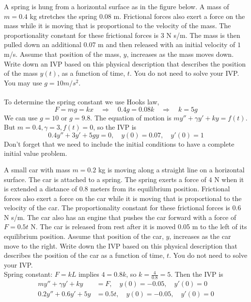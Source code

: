 \ifnum {}
\question[2] A spring is hung from a horizontal surface as in the figure below. A mass of $m=0.4$ kg stretches the spring 0.08 m. Frictional forces also exert a force on the mass while it is moving that is proportional to the velocity of the mass. The proportionality constant for these frictional forces is 3 N s/m. The mass is then pulled down an additional 0.07 m and then released with an initial velocity of $1$ m/s. Assume that position of the mass, $y$, increases as the mass moves down. Write down an IVP based on this physical description that describes the position of the mass $y(t)$, as a function of time, $t$. You do not need to solve your IVP. You may use $g=10 m/s^2$.  \\[4pt]


\ifnum {} {\color{DarkBlue} \\[12pt] 
To determine the spring constant we use Hooks law, 
$$F = mg  = kx \quad \Rightarrow \quad 0.4g = 0.08k \quad \Rightarrow \quad k = 5g$$
We can use $g=10$ or $g=9.8$. The equation of motion is $my''+\gamma y' + ky = f(t)$.
But $m=0.4, \gamma = 3, f(t) = 0$, so the IVP is
$$0.4y'' + 3 y' + 5gy = 0, \quad y(0) = 0.07, \quad y'(0) = 1$$
Don't forget that we need to include the initial conditions to have a complete initial value problem.
} 
\else 
\vfill
\fi
\fi 



\ifnum {}
\question[2] A small car with mass $m = 0.2$ kg is moving along a straight line on a horizontal surface. The car is attached to a spring. The spring exerts a force of $4$ N when it is extended a distance of $0.8$ meters from its equilibrium position. Frictional forces also exert a force on the car while it is moving that is proportional to the velocity of the car. The proportionality constant for these frictional forces is $0.6$ N s/m. The car also has an engine that pushes the car forward with a force of $F = 0.5t$ N. The car is released from rest after it is moved 0.05 m to the left of its equilibrium position. Assume that position of the car, $y$, increases as the car move to the right. Write down the IVP based on this physical description that describes the position of the car as a function of time, $t$. You do not need to solve your IVP. \\
% 

\ifnum {} {\color{DarkBlue} 
Spring constant: $F = kL$ implies $4 = 0.8k$, so $k = \frac{4}{0.8} = 5$. Then the IVP is
\begin{align}
    my'' + \gamma y' + ky &= F, \quad y(0) = -0.05, \quad y'(0) = 0 \\
    0.2y'' + 0.6 y' + 5y &= 0.5t, \quad y(0) = -0.05, \quad y'(0) = 0 
\end{align}
} 
\else 
\fi
\fi 



